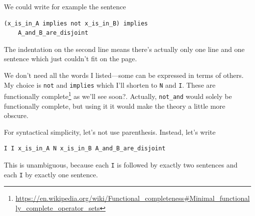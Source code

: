 \documentclass[11pt,oneside,%
]{memoir}
\theoremstyle{definition}
\begin{document}
 We could write for example the sentence
\begin{lstlisting}
(x_is_in_A implies not x_is_in_B) implies
    A_and_B_are_disjoint
\end{lstlisting}
The indentation on the second line means there's actually only one line and one sentence which just couldn't fit on the page.

We don't need all the words I listed---some can be expressed in terms of others. My choice is \lstinline!not! and \lstinline!implies! which I'll shorten to \lstinline[language=propositio]!N! and \lstinline[language=propositio]!I!. These are functionally complete\footnote{\url{https://en.wikipedia.org/wiki/Functional_completeness\#Minimal_functionally_complete_operator_sets}} as we'll see soon?. Actually, \lstinline!not_and! would solely be functionally complete, but using it it would make the theory a little more obscure.

For syntactical simplicity, let's not use parenthesis. Instead, let's write
\begin{lstlisting}[language=propositio]
I I x_is_in_A N x_is_in_B A_and_B_are_disjoint
\end{lstlisting}
This is unambiguous, because each \lstinline[language=propositio]!I! is followed by exactly two sentences and each \lstinline[language=propositio]!I! by exactly one sentence.
\end{document}
